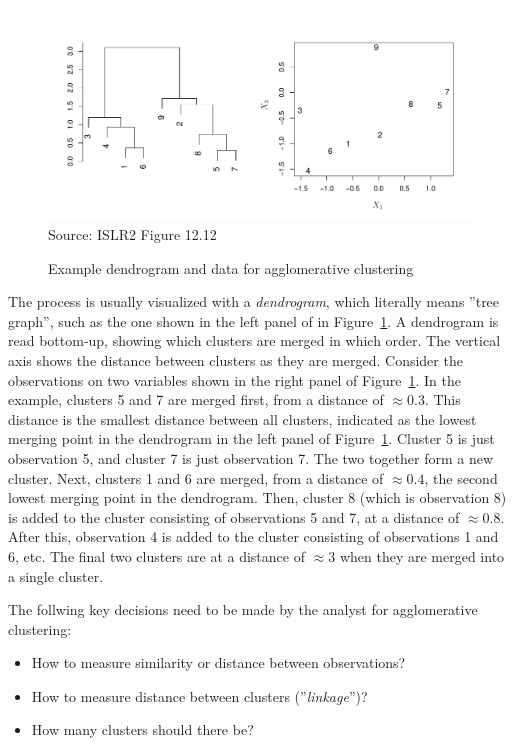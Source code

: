 \begin{figure}
\centering
\includegraphics[width=.9\textwidth]{../class11/Figures_Chapters_7-13/Chapter12/12_12.pdf} \\

\scriptsize Source: ISLR2 Figure 12.12
\caption{Example dendrogram and data for agglomerative clustering}
\label{fig:dendro1}
\end{figure}

The process is usually visualized with a \emph{dendrogram}, which literally means ''tree graph'', such as the one shown in the left panel of in Figure~\ref{fig:dendro1}. A dendrogram is read bottom-up, showing which clusters are merged in which order. The vertical axis shows the distance between clusters as they are merged. Consider the observations on two variables shown in the right panel of Figure~\ref{fig:dendro1}. In the example, clusters 5 and 7 are merged first, from a distance of $\approx 0.3$. This distance is the smallest distance between all clusters, indicated as the lowest merging point in the dendrogram in the left panel of Figure~\ref{fig:dendro1}. Cluster 5 is just observation 5, and cluster 7 is just observation 7. The two together form a new cluster. Next, clusters 1 and 6 are merged, from a distance of $\approx 0.4$, the second lowest merging point in the dendrogram. Then, cluster 8 (which is observation 8) is added to the cluster consisting of observations 5 and 7, at a distance of $\approx 0.8$. After this, observation 4 is added to the cluster consisting of observations 1 and 6, etc. The final two clusters are at a distance of $\approx 3$ when they are merged into a single cluster. 

The follwing key decisions need to be made by the analyst for agglomerative clustering:

\begin{itemize}
   \item How to measure similarity or distance between observations?
   \item How to measure distance between clusters (''\emph{linkage}'')?
   \item How many clusters should there be?
\end{itemize}

